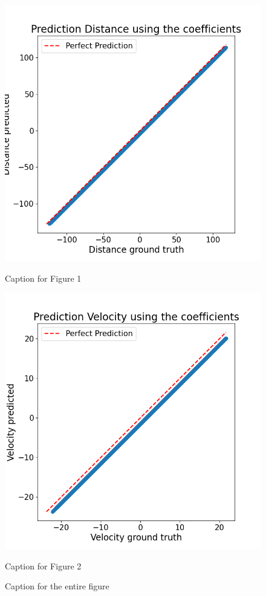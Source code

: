 \begin{figure}[t]
    \centering
    \begin{minipage}[b]{0.45\columnwidth}
        \centering
        \includegraphics[width=\columnwidth]{images/figures/Prediction Distance using the coefficients.png}
        \caption{Caption for Figure 1}
        \label{fig:minipage3}
    \end{minipage}
    \hfill
    \begin{minipage}[b]{0.45\columnwidth}
        \centering
        \includegraphics[width=\columnwidth]{images/figures/Prediction Velocity using the coefficients.png}
        \caption{Caption for Figure 2}
        \label{fig:minipage4}
    \end{minipage}
    \caption{Caption for the entire figure}
    \label{fig:combined_figure_2}
\end{figure}


